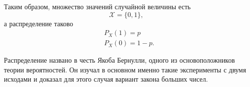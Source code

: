 \documentclass[a4paper,12pt]{article}
\newcounter{z-counter}
\newcounter{th-counter}
\begin{document}
Таким образом, множество значений случайной величины есть
\[
\mathcal{X} = \{0, 1\},
\]
а распределение таково
\begin{align*}
    &P_X(1) = p\\
    &P_X(0) = 1-p. 
\end{align*}

Распределение названо в честь Якоба Бернулли, одного из основоположников теории вероятностей. Он изучал в основном именно такие эксперименты с двумя исходами и доказал для этого случая вариант закона больших чисел.

\begin{center}
\end{center}
\end{document}
